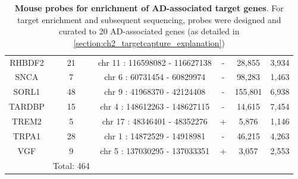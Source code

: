 \begin{table}[ht]
\begin{tabular}{@{}cccccc@{}}
		RHBDF2 & 21         & chr  11 : 116598082 -   116627138 & - & 28,855  & 3,934  \\
		SNCA   & 7          & chr  6 : 60731454 -   60829974    & - & 98,283  & 1,463  \\
		SORL1  & 48         & chr  9 : 41968370 -   42124408    & - & 155,801 & 6,938  \\
		TARDBP & 15         & chr  4 : 148612263 -   148627115  & - & 14,615  & 7,454  \\
		TREM2  & 5          & chr  17 : 48346401 -   48352276   & + & 5,876   & 1,146  \\
		TRPA1  & 28         & chr  1 : 14872529 -   14918981    & - & 46,215  & 4,263  \\
		VGF    & 9          & chr  5 : 137030295 -   137033351  & + & 3,057   & 2,553  \\
		& Total: 464 &                                   &   &         &        \\ \bottomrule
	\end{tabular}
\caption[Mouse probes for enrichment of AD-associated target genes]%
{\textbf{Mouse probes for enrichment of AD-associated target genes}. For target enrichment and subsequent sequencing, probes were designed and curated to 20 AD-associated genes (as detailed in \cref{section:ch2_targetcapture_explanation})}
\label{tab:mouse_probes}
\end{table}


